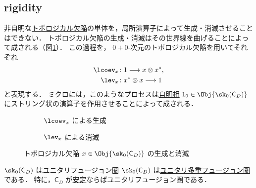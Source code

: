 \documentclass[TQFT_main]{subfiles}
\begin{document}
\subsection{rigidity}

非自明な\hyperref[def:TD]{トポロジカル欠陥}の単体を，局所演算子によって生成・消滅させることはできない．
トポロジカル欠陥の生成・消滅はその世界線を曲げることによって成される（図\ref{fig:creanh}）．
この過程を， $0+0$-次元のトポロジカル欠陥を用いてそれぞれ
\begin{align}
    \lcoev_x &\colon 1 \lto x \otimes x^*, \\
    \lev_x &\colon x^* \otimes x \lto 1
\end{align}
と表現する．
ミクロには，このようなプロセスは\hyperref[def:trivialTO]{自明相} $1_0 \in \Obj{\sk_0(\mathsf{C}_D)}$ にストリング状の演算子を作用させることによって成される．
\begin{figure}[H]
    \centering
    \begin{subfigure}{0.4\columnwidth}
        \centering
        \caption{$\lcoev_x$ による生成}
    \end{subfigure}
    \hspace{5mm}
    \begin{subfigure}{0.4\columnwidth}
        \centering
        \caption{$\lev_x$ による消滅}
    \end{subfigure}
    \caption{トポロジカル欠陥 $x \in \Obj{\sk_0(\mathsf{C}_D)}$ の生成と消滅}
    \label{fig:creanh}
\end{figure}%

\begin{mypropph}[label=prop:sk0-unitaryfusion]{$\sk_0(\mathsf{C}_D)$ はユニタリフュージョン圏}
    $\sk_0(\mathsf{C}_D)$ は\hyperref[def:unitary-monoidal]{ユニタリ}\hyperref[def:tensorfusion-cat]{多重フュージョン圏}である．
    特に，$\mathsf{C}_D$ が\hyperref[def:stableTO]{安定}ならばユニタリフュージョン圏である．
\end{mypropph}
\end{document}
